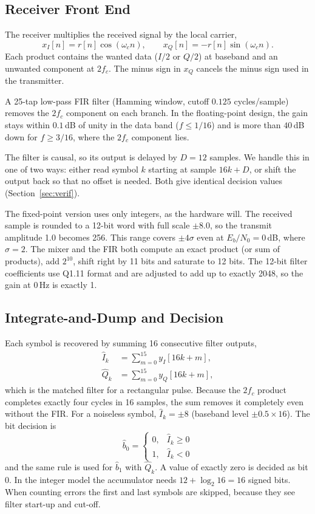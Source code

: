 \documentclass[10pt,twocolumn,letterpaper]{article}
\begin{document}
\subsection{Receiver Front End}

The receiver multiplies the received signal by the local carrier,
\begin{equation}
x_I[n]=r[n]\cos(\omega_c n), \qquad x_Q[n]=-r[n]\sin(\omega_c n).
\end{equation}
Each product contains the wanted data ($I/2$ or $Q/2$) at baseband and
an unwanted component at $2f_c$. The minus sign in $x_Q$ cancels the
minus sign used in the transmitter.

A 25-tap low-pass FIR filter (Hamming window, cutoff $0.125$
cycles/sample) removes the $2f_c$ component on each branch. In the
floating-point design, the gain stays within $0.1$\,dB of unity in the
data band ($f\le 1/16$) and is more than $40$\,dB down for
$f\ge 3/16$, where the $2f_c$ component lies.

The filter is causal, so its output is delayed by $D=12$ samples. We
handle this in one of two ways: either read symbol $k$ starting at
sample $16k+D$, or shift the output back so that no offset is needed.
Both give identical decision values (Section~\ref{sec:verif}).

The fixed-point version uses only integers, as the hardware will. The
received sample is rounded to a 12-bit word with full scale $\pm8.0$,
so the transmit amplitude 1.0 becomes 256. This range covers $\pm4\sigma$
even at $E_b/N_0=0$\,dB, where $\sigma=2$. The mixer and the FIR both
compute an exact product (or sum of products), add $2^{10}$, shift right
by 11 bits and saturate to 12 bits. The 12-bit filter coefficients use
Q1.11 format and are adjusted to add up to exactly 2048, so the gain at
0\,Hz is exactly 1.

\subsection{Integrate-and-Dump and Decision}

Each symbol is recovered by summing 16 consecutive filter outputs,
\begin{align}
\hat I_k&=\sum_{m=0}^{15} y_I[16k+m],\\
\hat Q_k&=\sum_{m=0}^{15} y_Q[16k+m],
\end{align}
which is the matched filter for a rectangular pulse. Because the $2f_c$
product completes exactly four cycles in 16 samples, the sum removes it
completely even without the FIR. For a noiseless symbol, $\hat I_k=\pm8$
(baseband level $\pm0.5\times16$). The bit decision is
\begin{equation}
\hat b_0=\begin{cases}0,&\hat I_k\ge 0\\1,&\hat I_k<0\end{cases}
\end{equation}
and the same rule is used for $\hat b_1$ with $\hat Q_k$. A value of exactly
zero is decided as bit 0. In the integer model the
accumulator needs $12+\log_2 16=16$ signed bits. When counting errors the
first and last symbols are skipped, because they see filter start-up and
cut-off.
\end{document}
